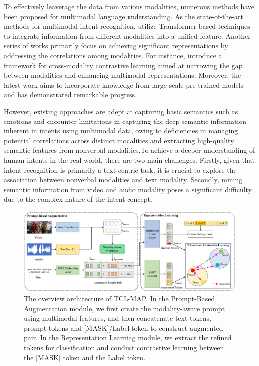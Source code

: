 \documentclass[letterpaper]{article} %
\begin{document}
To effectively leaverage the data from various modalities, numerous methods have been proposed for multimodal language understanding. As the state-of-the-art methods for multimodal intent recognition, \cite{tsai2019multimodal, 10.1145/3394171.3413678, rahman2020integrating} utilize Transformer-based techniques to integrate information from different modalities into a unified feature. Another series of works primarily focus on achieving significant representations by addressing the correlations among modalities. For instance, \cite{dong2022improving} introduce a framework for cross-modality contrastive learning aimed at narrowing the gap between modalities and enhancing multimodal representations. Moreover, the latest work \cite{yu-etal-2023-speech} aims to incorporate knowledge from large-scale pre-trained models and has demonstrated remarkable progress.

However, existing approaches are adept at capturing basic semantics such as emotions and encounter limitations in capturing the deep semantic information inherent in intents using multimodal data, owing to deficiencies in managing potential correlations across distinct modalities and extracting high-quality semantic features from nonverbal modalities.To achieve a deeper understanding of human intents in the real world, there are two main challenges. Firstly, given that intent recognition is primarily a text-centric task, it is crucial to explore the association between nonverbal modalities and text modality. Secondly, mining semantic information from video and audio modality poses a significant difficulty due to the complex nature of the intent concept.

\begin{figure}[h!]
\centering
\includegraphics[scale=.21]{Figs/TCL_MAP.pdf}
\caption{ \protect \label{TCL_MAP} The overview architecture of TCL-MAP. In the Prompt-Based Augmentation module, we first create the modality-aware prompt using multimodal features, and then concatenate text tokens, prompt tokens and [MASK]/Label token to construct augmented pair. In the Representation Learning module, we extract the refined tokens for classification and conduct  contrastive learning between the [MASK] token and the Label token.
}
\end{figure}
\end{document}
